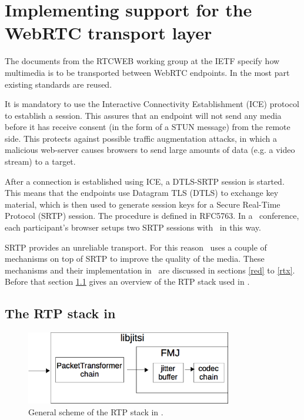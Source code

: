 \documentclass[twoside,openright,a4paper,12pt,english]{article}
\begin{document}
\section{Implementing support for the WebRTC transport layer}
The documents from the RTCWEB working group at the IETF specify how multimedia
is to be transported between WebRTC endpoints. In the most part existing
standards are reused.

It is mandatory to use the Interactive Connectivity Establishment (ICE\cite{ice}) protocol to
establish a session. This assures that an endpoint will not send any media
before it has receive consent (in the form of a STUN message) from the remote
side. This protects against possible traffic augmentation attacks, in which a malicious
web-server causes browsers to send large amounts of data (e.g. a video stream) to a
target.

After a connection is established using ICE, a DTLS-SRTP session is started.
This means that the endpoints use Datagram TLS (DTLS\cite{dtls})
to exchange key material, which is then used to generate session keys for a
Secure Real-Time Protocol (SRTP\cite{srtp})
session. The procedure is defined in RFC5763\cite{rfc5763}.
In a \jm\ conference, each participant's browser setups two SRTP sessions with
\jvb\ in this way.

\medskip
SRTP provides an unreliable transport. For this reason \wrtc\ uses a couple of
mechanisms on top of SRTP to improve the quality of the media. These mechanisms
and their implementation in \lj\ are discussed in sections \ref{red} to
\ref{rtx}. Before that section \ref{lj} gives an overview of the RTP stack used
in \lj.


\subsection{The RTP stack in \lj}
\label{lj}

\begin{figure}
    \centering
    \includegraphics[width=9cm]{./pics/lj.eps}
    \caption{General scheme of the RTP stack in \lj.}
    \label{lj-scheme}
\end{figure}
\end{document}
